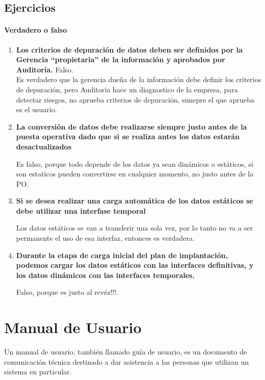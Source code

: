 \documentclass[12pt]{book}
\begin{document}
\section{Ejercicios}


\subsubsection{Verdadero o falso}
	\begin{enumerate}
		\item \textbf{Los criterios de depuración de datos deben ser definidos por la Gerencia “propietaria” 				de la información y aprobados por Auditoría.} Falso. \\
				Es verdadero que la gerencia dueña de la información debe definir los criterios de 								depuración, pero Auditoria hace un diagnostico de la empresa, para detectar riesgos, no 						aprueba criterios de depuración, simepre el que aprueba es el usuario.
				
		\item \textbf{La conversión de datos debe realizarse siempre justo antes de la puesta operativa dado
				que si se realiza antes los datos estarán desactualizados} 
				
				Es falso, porque todo depende de los datos ya sean dinámicos o estáticos, si son estaticos 						pueden convertirse en cualquier momento, no justo antes de la PO.
				
		\item \textbf{Si se desea realizar una carga automática de los datos estáticos se debe utilizar una
				interfase temporal}
				
				Los datos estáticos se van a transferir una sola vez, por lo tanto no va a ser permanente 
				el uso de esa interfaz, entonces es verdadera.
				
		\item \textbf{Durante la etapa de carga inicial del plan de implantación, podemos cargar los datos
				estáticos con las interfaces definitivas, y los datos dinámicos con las interfaces 								temporales.}
				
				Falso, porque es justo al revéz!!!.
	\end{enumerate}


\chapter{Manual de Usuario}Un manual de usuario, también llamado guía de usuario, es un documento de comunicación técnica destinado a dar asistencia a las personas que utilizan un sistema en particular.
\end{document}
